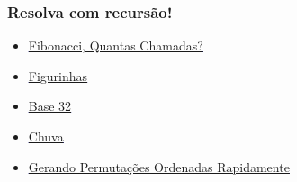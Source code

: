 \documentclass{beamer}
\begin{document}
	\begin{frame}
	\frametitle{Resolva com recurs\~ao!}
	\begin{itemize}
	\item \textcolor{blue}{\underline{\href{https://www.urionlinejudge.com.br/judge/pt/problems/view/1029}{Fibonacci, Quantas Chamadas?}}}
	\item \textcolor{blue}{\underline{\href{https://www.urionlinejudge.com.br/judge/pt/problems/view/1028}{Figurinhas}}}
	\item \textcolor{blue}{\underline{\href{https://www.urionlinejudge.com.br/judge/pt/problems/view/1869}{Base 32}}}
	\item \textcolor{blue}{\underline{\href{https://www.urionlinejudge.com.br/judge/pt/problems/view/3052}{Chuva}}}
	\item \textcolor{blue}{\underline{\href{https://www.urionlinejudge.com.br/judge/pt/problems/view/1401}{Gerando Permuta\c{c}\~oes Ordenadas Rapidamente}}}
	\end{itemize}
	\end{frame}
\end{document}
